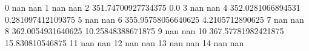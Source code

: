 0 nan nan
1 nan nan
2 351.74700927734375 0.0
3 nan nan
4 352.0281066894531 0.281097412109375
5 nan nan
6 355.95758056640625 4.2105712890625
7 nan nan
8 362.0054931640625 10.25848388671875
9 nan nan
10 367.57781982421875 15.830810546875
11 nan nan
12 nan nan
13 nan nan
14 nan nan
